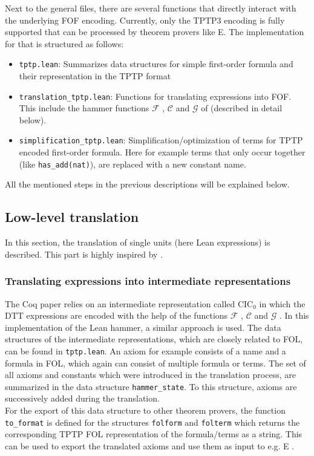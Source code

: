 \documentclass[a4paper]{article}
\newcommand{\F}[0]{$\mathcal{F}$ }
\newcommand{\G}[0]{$\mathcal{G}$ }
\newcommand{\C}[0]{$\mathcal{C}$ }
\begin{document}
Next to the general files, there are several functions that directly interact with the underlying FOF encoding. Currently, only the TPTP3 encoding is fully supported that can be processed by theorem provers like E. The implementation for that is structured as follows:
\begin{itemize}
	\item \texttt{tptp.lean}: Summarizes data structures for simple first-order formula and their representation in the TPTP format
	\item \texttt{translation\_tptp.lean}: Functions for translating expressions into FOF. This include the hammer functions \F, \C and \G of  \cite{CoqHammer} (described in detail below). 
	\item \texttt{simplification\_tptp.lean}: Simplification/optimization of terms for TPTP encoded first-order formula. Here for example terms that only occur together (like \texttt{has\_add(nat)}), are replaced with a new constant name.
\end{itemize}

All the mentioned steps in the previous descriptions will be explained below.

\subsection{Low-level translation}

In this section, the translation of single units (here Lean expressions) is described. This part is highly inspired by \cite{CoqHammer}.

\subsubsection{Translating expressions into intermediate representations}
\label{sec:term_translation}
The Coq paper relies on an intermediate representation called $\text{CIC}_0$ in which the DTT expressions are encoded with the help of the functions \F, \C and \G. In this implementation of the Lean hammer, a similar approach is used. The data structures of the intermediate representations, which are closely related to FOL, can be found in \texttt{tptp.lean}. An axiom for example consists of a name and a formula in FOL, which again can consist of multiple formula or terms. The set of all axioms and constants which were introduced in the translation process, are summarized in the data structure \texttt{hammer\_state}. To this structure, axioms are successively added during the translation.\\
For the export of this data structure to other theorem provers, the function \texttt{to\_format} is defined for the structures \texttt{folform} and \texttt{folterm} which returns the corresponding TPTP FOL representation of the formula/terms as a string. This can be used to export the translated axioms and use them as input to e.g. E \cite{EProver}.\\
\end{document}
